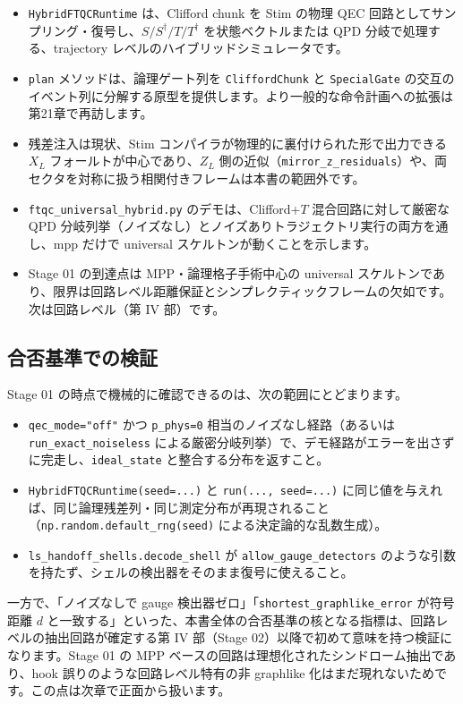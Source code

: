 \begin{itemize}
  \item \texttt{HybridFTQCRuntime} は、Clifford chunk を Stim の物理 QEC 回路としてサンプリング・復号し、$S/S^\dagger/T/T^\dagger$ を状態ベクトルまたは QPD 分岐で処理する、trajectory レベルのハイブリッドシミュレータです。
  \item \texttt{plan} メソッドは、論理ゲート列を \texttt{CliffordChunk} と \texttt{SpecialGate} の交互のイベント列に分解する原型を提供します。より一般的な命令計画への拡張は第21章で再訪します。
  \item 残差注入は現状、Stim コンパイラが物理的に裏付けられた形で出力できる $X_L$ フォールトが中心であり、$Z_L$ 側の近似（\texttt{mirror\_z\_residuals}）や、両セクタを対称に扱う相関付きフレームは本書の範囲外です。
  \item \texttt{ftqc\_universal\_hybrid.py} のデモは、Clifford+$T$ 混合回路に対して厳密な QPD 分岐列挙（ノイズなし）とノイズありトラジェクトリ実行の両方を通し、mpp だけで universal スケルトンが動くことを示します。
  \item Stage 01 の到達点は MPP・論理格子手術中心の universal スケルトンであり、限界は回路レベル距離保証とシンプレクティックフレームの欠如です。次は回路レベル（第 IV 部）です。
\end{itemize}

\subsection*{合否基準での検証}

Stage 01 の時点で機械的に確認できるのは、次の範囲にとどまります。

\begin{itemize}
  \item \texttt{qec\_mode="off"} かつ \texttt{p\_phys=0} 相当のノイズなし経路（あるいは \texttt{run\_exact\_noiseless} による厳密分岐列挙）で、デモ経路がエラーを出さずに完走し、\texttt{ideal\_state} と整合する分布を返すこと。
  \item \texttt{HybridFTQCRuntime(seed=...)} と \texttt{run(..., seed=...)} に同じ値を与えれば、同じ論理残差列・同じ測定分布が再現されること（\texttt{np.random.default\_rng(seed)} による決定論的な乱数生成）。
  \item \texttt{ls\_handoff\_shells.decode\_shell} が \texttt{allow\_gauge\_detectors} のような引数を持たず、シェルの検出器をそのまま復号に使えること。
\end{itemize}

一方で、「ノイズなしで gauge 検出器ゼロ」「\texttt{shortest\_graphlike\_error} が符号距離 $d$ と一致する」といった、本書全体の合否基準の核となる指標は、回路レベルの抽出回路が確定する第 IV 部（Stage 02）以降で初めて意味を持つ検証になります。Stage 01 の MPP ベースの回路は理想化されたシンドローム抽出であり、hook 誤りのような回路レベル特有の非 graphlike 化はまだ現れないためです。この点は次章で正面から扱います。


